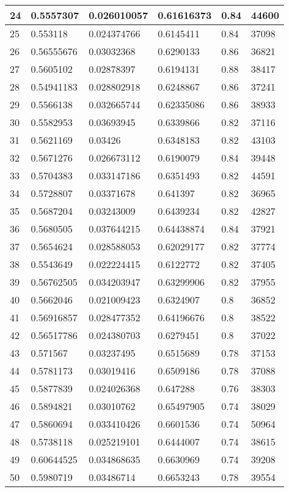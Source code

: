 \begin{longtable}{|l|l|l|l|l|l|}
24 & 0.5557307 & 0.026010057 & 0.61616373 & 0.84 & 44600 \\ \hline 
25 & 0.553118 & 0.024374766 & 0.6145411 & 0.84 & 37098 \\ \hline 
26 & 0.56555676 & 0.03032368 & 0.6290133 & 0.86 & 36821 \\ \hline 
27 & 0.5605102 & 0.02878397 & 0.6194131 & 0.88 & 38417 \\ \hline 
28 & 0.54941183 & 0.028802918 & 0.6248867 & 0.86 & 37241 \\ \hline 
29 & 0.5566138 & 0.032665744 & 0.62335086 & 0.86 & 38933 \\ \hline 
30 & 0.5582953 & 0.03693945 & 0.6339866 & 0.82 & 37116 \\ \hline 
31 & 0.5621169 & 0.03426 & 0.6348183 & 0.82 & 43103 \\ \hline 
32 & 0.5671276 & 0.026673112 & 0.6190079 & 0.84 & 39448 \\ \hline 
33 & 0.5704383 & 0.033147186 & 0.6351493 & 0.82 & 44591 \\ \hline 
34 & 0.5728807 & 0.03371678 & 0.641397 & 0.82 & 36965 \\ \hline 
35 & 0.5687204 & 0.03243009 & 0.6439234 & 0.82 & 42827 \\ \hline 
36 & 0.5680505 & 0.037644215 & 0.64438874 & 0.84 & 37921 \\ \hline 
37 & 0.5654624 & 0.028588053 & 0.62029177 & 0.82 & 37774 \\ \hline 
38 & 0.5543649 & 0.022224415 & 0.6122772 & 0.82 & 37405 \\ \hline 
39 & 0.56762505 & 0.034203947 & 0.63299906 & 0.82 & 37955 \\ \hline 
40 & 0.5662046 & 0.021009423 & 0.6324907 & 0.8 & 36852 \\ \hline 
41 & 0.56916857 & 0.028477352 & 0.64196676 & 0.8 & 38522 \\ \hline 
42 & 0.56517786 & 0.024380703 & 0.6279451 & 0.8 & 37022 \\ \hline 
43 & 0.571567 & 0.03237495 & 0.6515689 & 0.78 & 37153 \\ \hline 
44 & 0.5781173 & 0.03019416 & 0.6509186 & 0.78 & 37088 \\ \hline 
45 & 0.5877839 & 0.024026368 & 0.647288 & 0.76 & 38303 \\ \hline 
46 & 0.5894821 & 0.03010762 & 0.65497905 & 0.74 & 38029 \\ \hline 
47 & 0.5860694 & 0.033410426 & 0.6601536 & 0.74 & 50964 \\ \hline 
48 & 0.5738118 & 0.025219101 & 0.6444007 & 0.74 & 38615 \\ \hline 
49 & 0.60644525 & 0.034868635 & 0.6630969 & 0.74 & 39208 \\ \hline 
50 & 0.5980719 & 0.03486714 & 0.6653243 & 0.78 & 39554 \\ \hline 
\end{longtable}